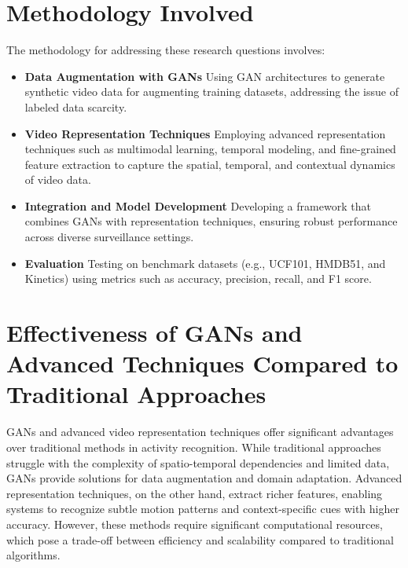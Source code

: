 \documentclass{article}
\begin{document}
\section*{Methodology Involved}
The methodology for addressing these research questions involves:
\begin{itemize}
    \item \textbf{Data Augmentation with GANs} Using GAN architectures to generate synthetic video data for augmenting training datasets, addressing the issue of labeled data scarcity.
    \item \textbf{Video Representation Techniques} Employing advanced representation techniques such as multimodal learning, temporal modeling, and fine-grained feature extraction to capture the spatial, temporal, and contextual dynamics of video data.
    \item \textbf{Integration and Model Development} Developing a framework that combines GANs with representation techniques, ensuring robust performance across diverse surveillance settings.
    \item \textbf{Evaluation} Testing on benchmark datasets (e.g., UCF101, HMDB51, and Kinetics) using metrics such as accuracy, precision, recall, and F1 score.
\end{itemize}

\section*{Effectiveness of GANs and Advanced Techniques Compared to Traditional Approaches}
GANs and advanced video representation techniques offer significant advantages over traditional methods in activity recognition. While traditional approaches struggle with the complexity of spatio-temporal dependencies and limited data, GANs provide solutions for data augmentation and domain adaptation. Advanced representation techniques, on the other hand, extract richer features, enabling systems to recognize subtle motion patterns and context-specific cues with higher accuracy. However, these methods require significant computational resources, which pose a trade-off between efficiency and scalability compared to traditional algorithms.
\end{document}
